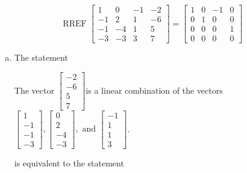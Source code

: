 \begin{exerciseAnswer} 
\[\operatorname{RREF}  \left[\begin{array}{ccc|c}
1 & 0 & -1 & -2 \\
-1 & 2 & 1 & -6 \\
-1 & -4 & 1 & 5 \\
-3 & -3 & 3 & 7
\end{array}\right] = \left[\begin{array}{ccc|c}
1 & 0 & -1 & 0 \\
0 & 1 & 0 & 0 \\
0 & 0 & 0 & 1 \\
0 & 0 & 0 & 0
\end{array}\right] \]
\begin{enumerate}[(a)]
\item  The statement 
\begin{center}\begin{minipage}{0.8\textwidth}
 The vector \( \left[\begin{array}{c}
-2 \\
-6 \\
5 \\
7
\end{array}\right] \)is a linear combination of the vectors \( \left[\begin{array}{c}
1 \\
-1 \\
-1 \\
-3
\end{array}\right] , \left[\begin{array}{c}
0 \\
2 \\
-4 \\
-3
\end{array}\right] , \text{ and } \left[\begin{array}{c}
-1 \\
1 \\
1 \\
3
\end{array}\right] \). 
\end{minipage}\end{center}
     is equivalent to the statement 
\begin{center}\begin{minipage}{0.8\textwidth}
 The vector equation \( x_{1} \left[\begin{array}{c}
1 \\
-1 \\
-1 \\
-3

\end{array}
\end{minipage}
\end{center}
\end{enumerate}
\end{exerciseAnswer}
